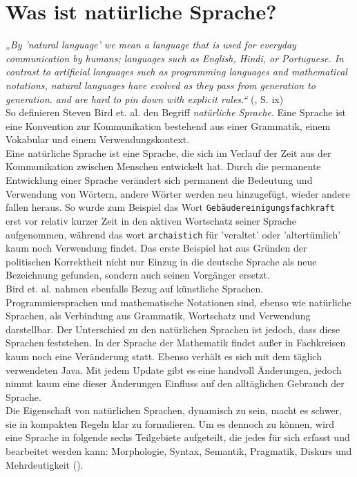 \documentclass[12pt,twoside]{article}
\theoremstyle{plain}
\theoremstyle{definition}
\theoremstyle{remark}
\begin{document}
\section{Was ist natürliche Sprache?}
\label{sec:def_lang}
\textit{„By 'natural language' we mean a language that is used for everyday communication by humans; languages such as English, Hindi, or Portuguese.
        In contrast to artificial languages such as programming languages and mathematical notations, natural languages have evolved as they pass from generation to generation.
        and are hard to pin down with explicit rules.“} (\cite{Bird2009}, S. ix)\\
So definieren Steven Bird et. al. den Begriff \textit{natürliche Sprache}.
Eine Sprache ist eine Konvention zur Kommunikation bestehend aus einer Grammatik, einem Vokabular und einem Verwendungskontext. \\
Eine natürliche Sprache ist eine Sprache, die sich im Verlauf der Zeit aus der Kommunikation zwischen Menschen entwickelt hat.
Durch die permanente Entwicklung einer Sprache verändert sich permanent die Bedeutung und Verwendung von Wörtern, andere Wörter werden neu hinzugefügt, wieder andere fallen heraus.
So wurde zum Beispiel das Wort \texttt{Gebäudereinigungsfachkraft} erst vor relativ kurzer Zeit in den aktiven Wortschatz seiner Sprache aufgenommen, während das wort \texttt{archaistich} für 'veraltet' oder 'altertümlich' kaum noch Verwendung findet.
Das erste Beispiel hat aus Gründen der politischen Korrektheit nicht nur Einzug in die deutsche Sprache als neue Bezeichnung gefunden, sondern auch seinen Vorgänger ersetzt.\\
Bird et. al. nahmen ebenfalls Bezug auf künstliche Sprachen.
Programmiersprachen und mathematische Notationen sind, ebenso wie natürliche Sprachen, als Verbindung aus Grammatik, Wortschatz und Verwendung darstellbar.
Der Unterschied zu den natürlichen Sprachen ist jedoch, dass diese Sprachen feststehen.
In der Sprache der Mathematik findet außer in Fachkreisen kaum noch eine Veränderung statt.
Ebenso verhält es sich mit dem täglich verwendeten Java.
Mit jedem Update gibt es eine handvoll Änderungen, jedoch nimmt kaum eine dieser Änderungen Einfluss auf den alltäglichen Gebrauch der Sprache.\\
Die Eigenschaft von natürlichen Sprachen, dynamisch zu sein, macht es schwer, sie in kompakten Regeln klar zu formulieren.
Um es dennoch zu können, wird eine Sprache in folgende sechs Teilgebiete aufgeteilt, die jedes für sich erfasst und bearbeitet werden kann:
Morphologie, Syntax, Semantik, Pragmatik, Diskurs und Mehrdeutigkeit (\cite{Jur2009}).\\
\end{document}
